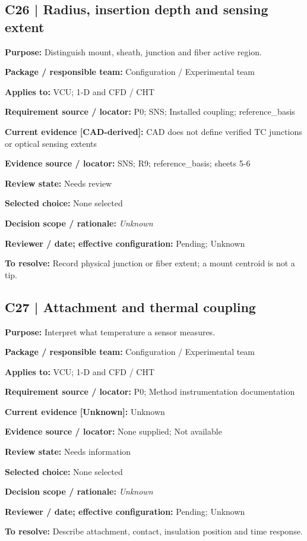 \documentclass[11pt]{article}
\begin{document}
\begin{minipage}{\textwidth}\small\setlength{\parskip}{2pt}
\subsection*{C26 | Radius, insertion depth and sensing extent}
\textbf{Purpose:} Distinguish mount, sheath, junction and fiber active region.\par
\textbf{Package / responsible team:} Configuration / Experimental team\par
\textbf{Applies to:} VCU; 1-D and CFD / CHT\par
\textbf{Requirement source / locator:} P0; SNS; Installed coupling; reference\_\allowbreak{}basis\par
\textbf{Current evidence [CAD-derived]:} CAD does not define verified TC junctions or optical sensing extents\par
\textbf{Evidence source / locator:} SNS; R9; reference\_\allowbreak{}basis; sheets 5-6\par
\textbf{Review state:} Needs review\par
\textbf{Selected choice:} None selected\par
\textbf{Decision scope / rationale:} \textit{Unknown}\par
\textbf{Reviewer / date; effective configuration:} Pending; Unknown\par
\textbf{To resolve:} Record physical junction or fiber extent; a mount centroid is not a tip.\par
\end{minipage}\par\vspace{5pt}
\begin{minipage}{\textwidth}\small\setlength{\parskip}{2pt}
\subsection*{C27 | Attachment and thermal coupling}
\textbf{Purpose:} Interpret what temperature a sensor measures.\par
\textbf{Package / responsible team:} Configuration / Experimental team\par
\textbf{Applies to:} VCU; 1-D and CFD / CHT\par
\textbf{Requirement source / locator:} P0; Method instrumentation documentation\par
\textbf{Current evidence [Unknown]:} Unknown\par
\textbf{Evidence source / locator:} None supplied; Not available\par
\textbf{Review state:} Needs information\par
\textbf{Selected choice:} None selected\par
\textbf{Decision scope / rationale:} \textit{Unknown}\par
\textbf{Reviewer / date; effective configuration:} Pending; Unknown\par
\textbf{To resolve:} Describe attachment, contact, insulation position and time response.\par
\end{minipage}\par\vspace{5pt}
\end{document}
